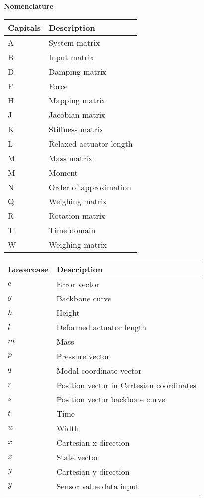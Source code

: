 \begin{spacing}{0.9}

\Large{\textbf{Nomenclature}}

\begin{multicols}{2}
\begin{table}[H]
\centering
    \begin{tabular}{p{1.7cm} p{4.8cm}} \hline
    \textbf{Capitals}    &   \textbf{Description }\\ \hline
    A      &  System matrix \\
    B     &  Input matrix \\
    D     &  Damping matrix \\
    F     & Force \\
    H     &  Mapping matrix \\
    J     &  Jacobian matrix \\
    K     &  Stiffness matrix \\
    L     &  Relaxed actuator length \\
    M     &  Mass matrix \\
    M     &  Moment \\
    N     & Order of approximation \\
    Q     & Weighing matrix \\
    R     & Rotation matrix \\
    T     & Time domain \\
    W     & Weighing matrix \\ \hline
    \end{tabular}
\end{table}




\begin{table}[H]
\centering
    \begin{tabular}{p{1.7cm} p{4.8cm}} \hline
    \textbf{Lowercase}    &   \textbf{Description }\\ \hline
     $e$     & Error vector \\
     $g$     & Backbone curve \\
     $h$     & Height \\
     $l$     & Deformed actuator length \\
     $m$     & Mass \\
     $p$     & Pressure vector \\
     $q$     & Modal coordinate vector \\
     $r$     & Position vector in Cartesian coordinates \\
     $s$     & Position vector backbone curve \\
     $t$     & Time \\
     $w$     & Width \\
     $x$     & Cartesian x-direction \\
     $x$     & State vector \\
     $y$     & Cartesian y-direction \\
     $y$     & Sensor value data input \\ \hline
    \end{tabular}
\end{table}




\end{multicols}
\end{spacing}
